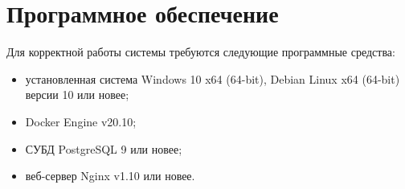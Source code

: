 \documentclass[../nirs.tex]{subfiles}
\begin{document}
    \section{Программное обеспечение}
    Для корректной работы системы требуются следующие программные средства:

    \begin{itemize}
        \item установленная система Windows 10 x64 (64-bit),
            Debian Linux x64 (64-bit) версии 10 или новее;
        \item Docker Engine v20.10;
        \item СУБД PostgreSQL 9 или новее;
        \item веб-сервер Nginx v1.10 или новее.
    \end{itemize}
\end{document}
